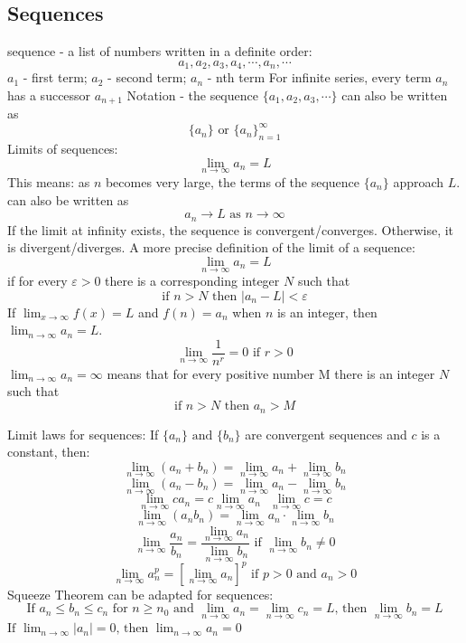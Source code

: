 \documentclass{article}
\begin{document}
    \subsection{Sequences} %
    \begin{outline}
        \1 sequence - a list of numbers written in a definite order: \[a_1, a_2, a_3, a_4, \cdots, a_n, \cdots \]
        \1 $a_1$ - first term; $a_2$ - second term; $a_n$ - nth term 
        \1 For infinite series, every term $a_n$ has a successor $a_{n+1}$
        \1 Notation - the sequence \(\{a_1, a_2, a_3, \cdots\}\) can also be written as \[\{a_n\}\text{ or }\{a_n\}^\infty_{n=1}\] 
        \1 Limits of sequences: \[\lim_{n\to\infty}a_n=L\]
            \2 This means: as $n$ becomes very large, the terms of the sequence $\{a_n\}$ approach $L$. 
        \1 can also be written as \[a_n\to L \text{ as } n\to\infty\]
        \1 If the limit at infinity exists, the sequence is convergent/converges. Otherwise, it is divergent/diverges. 
        \1 A more precise definition of the limit of a sequence: \[\lim_{n\to\infty}a_n=L\] if for every \(\varepsilon>0\) there is a corresponding integer $N$ such that \[\text{if }n>N\text{ then }|a_n-L|<\varepsilon\]
        \1 If \(\lim_{x\to\infty}f(x)=L\) and \(f(n)=a_n\) when $n$ is an integer, then \(\lim_{n\to\infty}a_n=L\). 
        \1 \[\lim_{n\to\infty}\dfrac{1}{n^r}=0\text{    if }r>0\]
        \1 \(\lim_{n\to\infty}a_n=\infty\) means that for every positive number M there is an integer $N$ such that \[\text{if }n>N\text{ then }a_n>M\]
    \end{outline}
    \begin{outline}
        \1 Limit laws for sequences: If \(\{a_n\}\text{ and }\{b_n\}\) are convergent sequences and $c$ is a constant, then: \[\lim_{n\to\infty}(a_n+b_n)=\lim_{n\to\infty}a_n+\lim_{n\to\infty}b_n\]\[\lim_{n\to\infty}(a_n-b_n)=\lim_{n\to\infty}a_n-\lim_{n\to\infty}b_n\]\[\lim_{n\to\infty}ca_n=c\lim_{n\to\infty}a_n\text{    }\lim_{n\to\infty}c=c\]\[\lim_{n\to\infty}(a_nb_n)=\lim_{n\to\infty}a_n\cdot\lim_{n\to\infty}b_n\]\[\lim_{n\to\infty}\dfrac{a_n}{b_n}=\dfrac{\lim_{n\to\infty}a_n}{\lim_{n\to\infty}b_n}\text{ if }\lim_{n\to\infty}b_n\neq0\]\[\lim_{n\to\infty}a_n^p=\left[\lim_{n\to\infty}a_n\right]^p\text{ if }p>0\text{ and }a_n>0\]
        \1 Squeeze Theorem can be adapted for sequences: \[\text{If }a_n\leq b_n\leq c_n\text{ for }n\geq n_0\text{ and }\lim_{n\to\infty}a_n=\lim_{n\to\infty}c_n=L\text{, then }\lim_{n\to\infty}b_n=L\]
        \1 \(\text{If }\lim_{n\to\infty}|a_n|=0\text{, then }\lim_{n\to\infty}a_n=0\)
    \end{outline}
\end{document}
